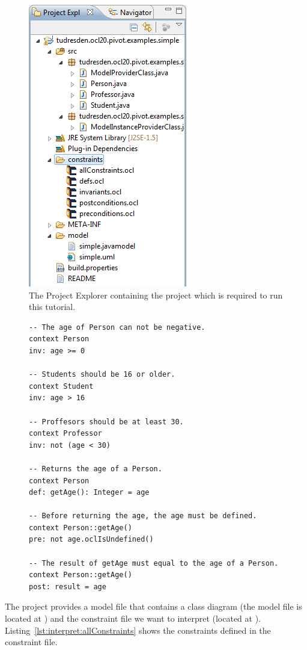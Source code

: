 \begin{figure}[!t]
	\centering
	\includegraphics[width=0.45\linewidth]{figures/examples/simple02}
	\caption{The Project Explorer containing the project which is required to run
	this tutorial.}
	\label{pic:example:simple02}
\end{figure}
	
\begin{figure}[!t]
  \lstset{
    language=OCL
  }
  \begin{lstlisting}[caption={The constraints contained in the constraint
  file.}, captionpos=b, label=lst:interpret:allConstraints]
-- The age of Person can not be negative.
context Person
inv: age >= 0

-- Students should be 16 or older.
context Student
inv: age > 16

-- Proffesors should be at least 30.
context Professor
inv: not (age < 30)

-- Returns the age of a Person.
context Person
def: getAge(): Integer = age

-- Before returning the age, the age must be defined.
context Person::getAge()
pre: not age.oclIsUndefined()

-- The result of getAge must equal to the age of a Person.
context Person::getAge()
post: result = age
  \end{lstlisting}
\end{figure}

The project provides a model file that contains a class diagram (the model file 
is located at ) and the constraint file we want to
interpret (located at 
). 
Listing~\ref{lst:interpret:allConstraints} shows the constraints defined in the
constraint file.

